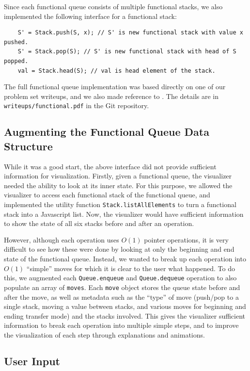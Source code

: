 \documentclass[runningheads]{llncs}
\begin{document}
Since each functional queue consists of multiple functional stacks, we also implemented the following interface for a functional stack:
\begin{verbatim}
    S' = Stack.push(S, x); // S' is new functional stack with value x pushed.
    S' = Stack.pop(S); // S' is new functional stack with head of S popped.
    val = Stack.head(S); // val is head element of the stack.
\end{verbatim}

The full functional queue implementation was based directly on one of our problem set writeups, and we also made reference to \cite{hood}. The details are in \texttt{writeups/functional.pdf} in the Git repository.

\subsection{Augmenting the Functional Queue Data Structure}

While it was a good start, the above interface did not provide sufficient information for visualization. Firstly, given a functional queue, the visualizer needed the ability to look at its inner state. For this purpose, we allowed the visualizer to access each functional stack of the functional queue, and implemented the utility function \texttt{Stack.listAllElements} to turn a functional stack into a Javascript list. Now, the visualizer would have sufficient information to show the state of all six stacks before and after an operation.

However, although each operation uses $O(1)$ pointer operations, it is very difficult to see how these were done by looking at only the beginning and end state of the functional queue. Instead, we wanted to break up each operation into $O(1)$ ``simple'' moves for which it is clear to the user what happened. To do this, we augmented each \texttt{Queue.enqueue} and \texttt{Queue.dequeue} operation to also populate an array of \texttt{moves}. Each \texttt{move} object stores the queue state before and after the move, as well as metadata such as the ``type'' of move (push/pop to a single stack, moving a value between stacks, and various moves for beginning and ending transfer mode) and the stacks involved. This gives the visualizer sufficient information to break each operation into multiple simple steps, and to improve the visualization of each step through explanations and animations.

\subsection{User Input}
\end{document}
